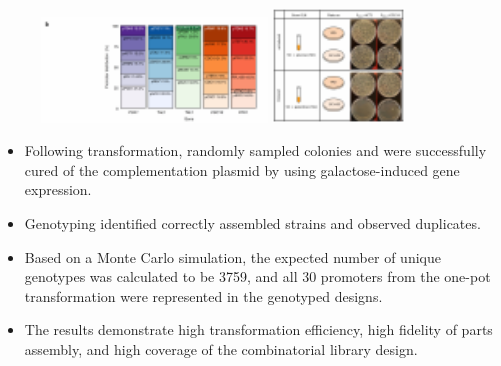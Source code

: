 \documentclass{beamer}
\begin{document}
\begin{frame}{}
	    \begin{figure}
		\flushleft
		\includegraphics[width=6cm]{pic/图片8.pdf}
		\includegraphics[width=3.5cm]{pic/图片9.pdf}
 	    \end{figure}

    \begin{itemize} [<+-| alert@+>] %
        \item\scriptsize Following transformation, randomly sampled colonies and were successfully cured of the complementation plasmid by using galactose-induced gene expression.
        \item\scriptsize Genotyping identified correctly assembled strains and observed duplicates. 
        \item\scriptsize Based on a Monte Carlo simulation, the expected number of unique genotypes was calculated to be 3759, and all 30 promoters from the one-pot transformation were represented in the genotyped designs.
        \item\scriptsize The results demonstrate high transformation efficiency, high fidelity of parts assembly, and high coverage of the combinatorial library design.
        
    \end{itemize}  
\end{frame}
\end{document}
